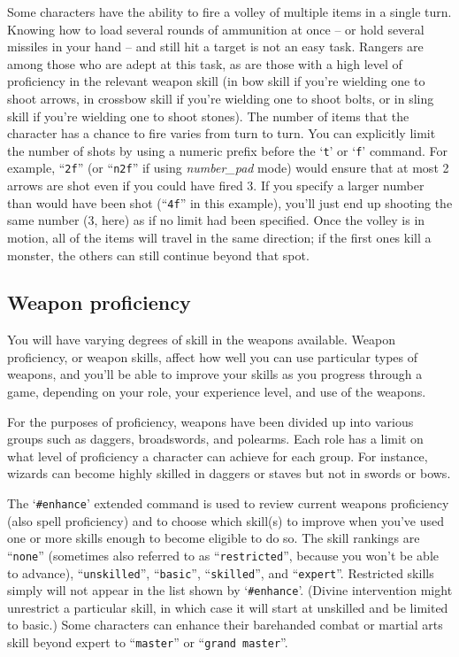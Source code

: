 Some characters have the ability to fire a volley of multiple items in a
single turn.  Knowing how to load several rounds of ammunition at
once -- or hold several missiles in your hand -- and still hit a
target is not an easy task.  Rangers are among those who are adept
at this task, as are those with a high level of proficiency in the
relevant weapon skill (in bow skill if you're wielding one to
shoot arrows, in crossbow skill if you're wielding one to shoot bolts,
or in sling skill if you're wielding one to shoot stones).
The number of items that the character has a chance to fire varies from
turn to turn.  You can explicitly limit the number of shots by using a
numeric prefix before the `{\tt t}' or `{\tt f}' command.
For example, ``{\tt 2f}'' (or ``{\tt n2f}'' if using
{\it number_pad\/} 
mode) would ensure that at most 2 arrows are shot
even if you could have fired 3.  If you specify
a larger number than would have been shot (``{\tt 4f}'' in this example),
you'll just end up shooting the same number (3, here) as if no limit
had been specified.  Once the volley is in motion, all of the items
will travel in the same direction; if the first ones kill a monster,
the others can still continue beyond that spot.
\subsection*{Weapon proficiency}


You will have varying degrees of skill in the weapons available.
Weapon proficiency, or weapon skills, affect how well you can use
particular types of weapons, and you'll be able to improve your skills
as you progress through a game, depending on your role, your experience
level, and use of the weapons.

For the purposes of proficiency, weapons have
been divided up into various groups such as daggers, broadswords, and
polearms.  Each role has a limit on what level of proficiency a character
can achieve for each group.  For instance, wizards can become highly
skilled in daggers or staves but not in swords or bows.

The `{\tt \#enhance}' extended command is used to review current weapons proficiency
(also spell proficiency) and to choose which skill(s) to improve when
you've used one or more skills enough to become eligible to do so.  The
skill rankings are ``{\tt none}'' (sometimes also referred to as ``{\tt restricted}'',
because you won't be able to advance), ``{\tt unskilled}'', ``{\tt basic}'', ``{\tt skilled}'',
and ``{\tt expert}''.  Restricted skills simply will not appear in the list
shown by `{\tt \#enhance}'.  (Divine intervention might unrestrict a particular
skill, in which case it will start at unskilled and be limited to basic.)
Some characters can enhance their barehanded combat or martial arts skill
beyond expert to ``{\tt master}'' or ``{\tt grand master}''.

